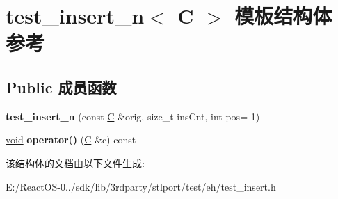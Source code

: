 \hypertarget{structtest__insert__n}{}\section{test\+\_\+insert\+\_\+n$<$ C $>$ 模板结构体 参考}
\label{structtest__insert__n}
\subsection*{Public 成员函数}
\begin{DoxyCompactItemize}
\item 
\mbox{\label{structtest__insert__n_a7af246da6e422c587693539f575143ed}} 
{\bfseries test\+\_\+insert\+\_\+n} (const \hyperlink{struct_c}{C} \&orig, size\+\_\+t ins\+Cnt, int pos=-\/1)
\item 
\mbox{\label{structtest__insert__n_a2dac71bd685387a35e8835e7d9a877d1}} 
\hyperlink{interfacevoid}{void} {\bfseries operator()} (\hyperlink{struct_c}{C} \&c) const
\end{DoxyCompactItemize}


该结构体的文档由以下文件生成\+:\begin{DoxyCompactItemize}
\item 
E\+:/\+React\+O\+S-\/0../sdk/lib/3rdparty/stlport/test/eh/test\+\_\+insert.\+h\end{DoxyCompactItemize}
